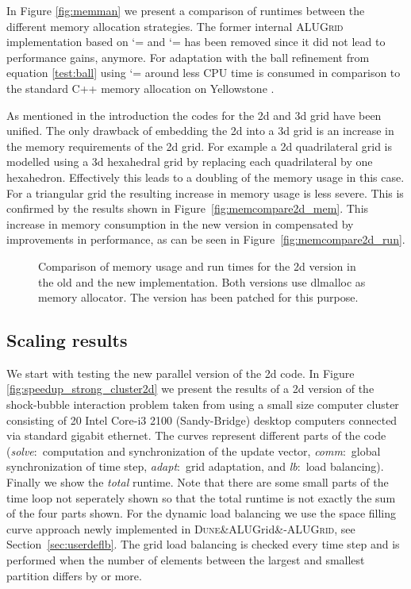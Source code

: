 \documentclass[10pt,notitlepage,a4paper]{article}
\makeatletter
\newcommand{\dune}[1][]{\textsc{Dune}\ifx&#1&\else\textsc{-{#1}}\fi\xspace}
\newcommand{\alugrid}{\textsc{ALUGrid}\xspace}
\newcommand{\code}[1]{ \lstinline[basicstyle=\small\sffamily]{#1} }
\renewcommand\lstinline[1][]{\leavevmode\bgroup \def\lst@boxpos{b}\lsthk@PreSet\lstset{flexiblecolumns,#1}\lsthk@TextStyle
          \ifnum\iffalse{\fi`}=\z@\fi
          \@ifnextchar\bgroup{\ifnum`{=\z@}\fi \afterassignment\lst@InlineG \let\@let@token}{\ifnum`{=\z@}\fi\lstinline@}}
\makeatother
\begin{document}
In Figure \ref{fig:memman} we present a comparison of runtimes between the different
memory allocation strategies. 
The former internal \alugrid implementation based on \code{std::map} and \code{std::stack} 
has been removed since it did not lead to performance gains, anymore.
For adaptation with the ball refinement from equation \eqref{test:ball} using
\code{dlmalloc} around  less CPU time is consumed in comparison to the standard
C++ memory allocation on Yellowstone \cite{Yellowstone}.



As mentioned in the introduction the codes for the 2d and 3d grid have been unified. 
The only drawback of embedding the 2d into a 3d
grid is an increase in the memory requirements of the 2d grid. For example a 2d
quadrilateral grid is modelled using a 3d hexahedral grid by replacing each quadrilateral by one
hexahedron. Effectively this leads to a doubling of the memory usage in this case.
For a triangular grid the resulting increase in memory usage is less severe.
This is confirmed by the results shown in Figure~\ref{fig:memcompare2d_mem}.
This increase in memory consumption in the new version in compensated by
improvements in performance, as can be seen in Figure~\ref{fig:memcompare2d_run}.

\begin{figure}
  \caption{Comparison of memory usage and run times for the 2d version
           in the old and the new implementation. Both versions use
           dlmalloc as memory allocator. The  version has been patched for this purpose.}
  \label{fig:memcompare2d}
\end{figure}

\subsection{Scaling results}
We start with testing the new parallel version of the 2d code.
In Figure \ref{fig:speedup_strong_cluster2d} we present the results of a 2d
version of the shock-bubble interaction problem taken from \cite{limiter:11} 
using a small size computer cluster consisting of 20 Intel Core-i3 2100 (Sandy-Bridge)
desktop computers connected via standard gigabit ethernet.
The curves represent different parts of the code
(\emph{solve}:\ computation and synchronization of the update vector,
\emph{comm}:\ global synchronization of time step,
\emph{adapt}:\ grid adaptation, and
\emph{lb}:\ load balancing).
Finally we show the \emph{total} runtime. Note that there are some small
parts of the time loop not seperately shown so that the total runtime is
not exactly the sum of the four parts shown. 
For the dynamic load
balancing we use the space filling curve approach newly implemented in
\dune[ALUGrid], see Section~\ref{sec:userdeflb}.
The grid load balancing is checked every  time step and 
is performed when the number of elements between the largest
and smallest partition differs by  or more. 
\end{document}
